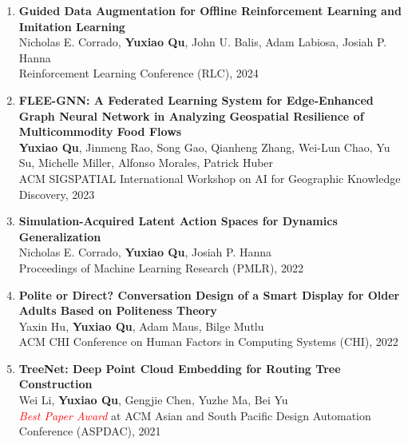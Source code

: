 \documentclass[11pt,letterpaper,roman,colorlinks=true,urlcolor=brown]{moderncv}
\begin{document}
\begin{enumerate}
    \\
    \textcolor{red}{\textit{Oral}} at Workshop on Large Language Models and Cognition, ICML 2024\\
    Advances in Neural Information Processing Systems (NeurIPS), 2024
    \item \textbf{Guided Data Augmentation for Offline Reinforcement Learning and Imitation Learning}\\
    Nicholas E. Corrado, \textbf{Yuxiao Qu}, John U. Balis, Adam Labiosa, Josiah P. Hanna
    \\
    Reinforcement Learning Conference (RLC), 2024
    \item \textbf{FLEE-GNN: A Federated Learning System for Edge-Enhanced Graph Neural Network in Analyzing Geospatial Resilience of Multicommodity Food Flows}\\
    \textbf{Yuxiao Qu}, Jinmeng Rao, Song Gao, Qianheng Zhang, Wei-Lun Chao, Yu Su, Michelle Miller, Alfonso Morales, Patrick Huber\\
    ACM SIGSPATIAL International Workshop on AI for Geographic Knowledge Discovery, 2023
    \item \textbf{Simulation-Acquired Latent Action Spaces for Dynamics Generalization}\\
    Nicholas E. Corrado, \textbf{Yuxiao Qu}, Josiah P. Hanna\\
    Proceedings of Machine Learning Research (PMLR), 2022
    \item \textbf{Polite or Direct? Conversation Design of a Smart Display for Older Adults Based on Politeness Theory}\\
    Yaxin Hu, \textbf{Yuxiao Qu}, Adam Maus, Bilge Mutlu\\
    ACM CHI Conference on Human Factors in Computing Systems (CHI), 2022
    \item \textbf{TreeNet: Deep Point Cloud Embedding for Routing Tree Construction}\\
    Wei Li, \textbf{Yuxiao Qu}, Gengjie Chen, Yuzhe Ma, Bei Yu\\
    \textcolor{red}{\textit{Best Paper Award}} at ACM Asian and South Pacific Design Automation Conference (ASPDAC), 2021
\end{enumerate}
\end{document}
